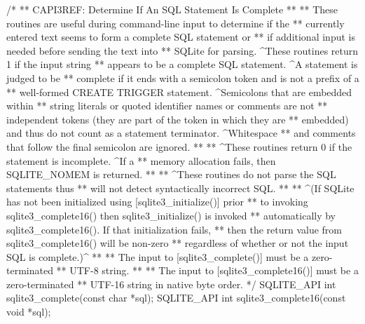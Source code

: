 \begin{Codex}[label=sqlite3.h,numbers=left]
{/*
** CAPI3REF: Determine If An SQL Statement Is Complete
**
** These routines are useful during command-line input to determine if the
** currently entered text seems to form a complete SQL statement or
** if additional input is needed before sending the text into
** SQLite for parsing.  ^These routines return 1 if the input string
** appears to be a complete SQL statement.  ^A statement is judged to be
** complete if it ends with a semicolon token and is not a prefix of a
** well-formed CREATE TRIGGER statement.  ^Semicolons that are embedded within
** string literals or quoted identifier names or comments are not
** independent tokens (they are part of the token in which they are
** embedded) and thus do not count as a statement terminator.  ^Whitespace
** and comments that follow the final semicolon are ignored.
**
** ^These routines return 0 if the statement is incomplete.  ^If a
** memory allocation fails, then SQLITE_NOMEM is returned.
**
** ^These routines do not parse the SQL statements thus
** will not detect syntactically incorrect SQL.
**
** ^(If SQLite has not been initialized using [sqlite3_initialize()] prior 
** to invoking sqlite3_complete16() then sqlite3_initialize() is invoked
** automatically by sqlite3_complete16().  If that initialization fails,
** then the return value from sqlite3_complete16() will be non-zero
** regardless of whether or not the input SQL is complete.)^
**
** The input to [sqlite3_complete()] must be a zero-terminated
** UTF-8 string.
**
** The input to [sqlite3_complete16()] must be a zero-terminated
** UTF-16 string in native byte order.
*/
SQLITE_API int sqlite3_complete(const char *sql);
SQLITE_API int sqlite3_complete16(const void *sql);

}
\end{Codex}
